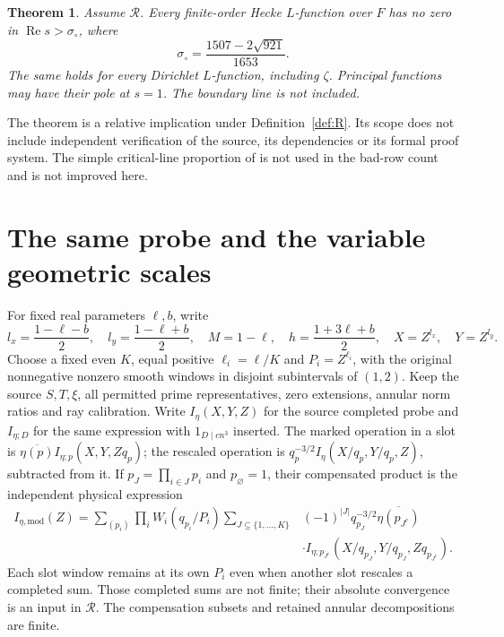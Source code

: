 \documentclass[11pt,a4paper]{article}
\newtheorem{theorem}{Theorem}[section]
\theoremstyle{definition}
\newcommand{\Rea}{\operatorname{Re}}
\newcommand{\sig}{\sigma_\circ}
\begin{document}
\begin{theorem}\label{thm:main}
Assume $\mathcal R$. Every finite-order Hecke $L$-function over $F$
has no zero in $\Rea s>\sig$, where
\[
 \sig=\frac{1507-2\sqrt{921}}{1653}.
\]
The same holds for every Dirichlet $L$-function, including $\zeta$.
Principal functions may have their pole at $s=1$.
The boundary line is not included.
\end{theorem}

The theorem is a relative implication under Definition~\ref{def:R}.
Its scope does not include independent verification of the source,
its dependencies or its formal proof system.
The simple critical-line proportion of \cite{AF} is not used in
the bad-row count and is not improved here.

\section{The same probe and the variable geometric scales}
\label{sec:geometry}
For fixed real parameters $\ell,b$, write
\begin{equation}\label{eq:geometry}
 l_x=\frac{1-\ell-b}{2},\quad l_y=\frac{1-\ell+b}{2},\quad
 M=1-\ell,\quad h=\frac{1+3\ell+b}{2},\quad
 X=Z^{l_x},\quad Y=Z^{l_y}.
\end{equation}
Choose a fixed even $K$, equal positive $\ell_i=\ell/K$ and
$P_i=Z^{\ell_i}$, with the original nonnegative nonzero smooth
windows in disjoint subintervals of $(1,2)$.
Keep the source $S,T,\xi$, all permitted prime representatives,
zero extensions, annular norm ratios and ray calibration.
Write $I_\eta(X,Y,Z)$ for the source completed probe and
$I_{\eta;D}$ for the same expression with $1_{D\mid cn^3}$
inserted. The marked operation in a slot is
$\overline{\eta(p)}I_{\eta;p}(X,Y,Zq_p)$; the rescaled operation
is $q_p^{-3/2}I_\eta(X/q_p,Y/q_p,Z)$, subtracted from it.
If $p_J=\prod_{i\in J}p_i$ and $p_\varnothing=1$, their
compensated product is the independent physical expression
\[
\begin{split}
 I_{\eta,\mathrm{mod}}(Z)
 =\sum_{(p_i)}\prod_iW_i(q_{p_i}/P_i)
 \sum_{J\subseteq\{1,\ldots,K\}}&
 (-1)^{|J|}q_{p_J}^{-3/2}\overline{\eta(p_{J^c})}\\
 &\cdot I_{\eta;p_{J^c}}(X/q_{p_J},Y/q_{p_J},Zq_{p_{J^c}}).
\end{split}
\]
Each slot window remains at its own $P_i$ even when another
slot rescales a completed sum.
Those completed sums are not finite; their absolute convergence is an
input in $\mathcal R$.
The compensation subsets and retained annular decompositions are finite.
\end{document}
